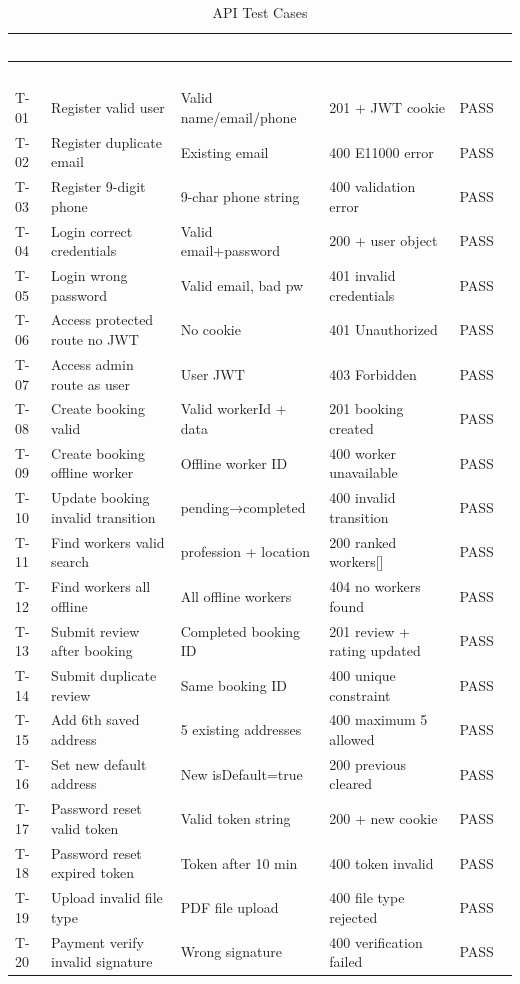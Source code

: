 \documentclass[12pt,a4paper]{report}
\newcommand{\thead}[1]{\cellcolor{tableheader}\textcolor{white}{\textbf{#1}}}
\begin{document}
\begin{longtable}{|p{0.6cm}|p{3cm}|p{4cm}|p{2.5cm}|p{2cm}|}
\caption{API Test Cases}\label{tab:testcases}\\
\hline
\thead{ID} & \thead{Test Case} & \thead{Input} & \thead{Expected} & \thead{Result} \\
\hline
\endfirsthead
\hline
\thead{ID} & \thead{Test Case} & \thead{Input} & \thead{Expected} & \thead{Result} \\
\hline
\endhead
T-01 & Register valid user & Valid name/email/phone & 201 + JWT cookie & PASS \\
\hline
T-02 & Register duplicate email & Existing email & 400 E11000 error & PASS \\
\hline
T-03 & Register 9-digit phone & 9-char phone string & 400 validation error & PASS \\
\hline
T-04 & Login correct credentials & Valid email+password & 200 + user object & PASS \\
\hline
T-05 & Login wrong password & Valid email, bad pw & 401 invalid credentials & PASS \\
\hline
T-06 & Access protected route no JWT & No cookie & 401 Unauthorized & PASS \\
\hline
T-07 & Access admin route as user & User JWT & 403 Forbidden & PASS \\
\hline
T-08 & Create booking valid & Valid workerId + data & 201 booking created & PASS \\
\hline
T-09 & Create booking offline worker & Offline worker ID & 400 worker unavailable & PASS \\
\hline
T-10 & Update booking invalid transition & pending→completed & 400 invalid transition & PASS \\
\hline
T-11 & Find workers valid search & profession + location & 200 ranked workers[] & PASS \\
\hline
T-12 & Find workers all offline & All offline workers & 404 no workers found & PASS \\
\hline
T-13 & Submit review after booking & Completed booking ID & 201 review + rating updated & PASS \\
\hline
T-14 & Submit duplicate review & Same booking ID & 400 unique constraint & PASS \\
\hline
T-15 & Add 6th saved address & 5 existing addresses & 400 maximum 5 allowed & PASS \\
\hline
T-16 & Set new default address & New isDefault=true & 200 previous cleared & PASS \\
\hline
T-17 & Password reset valid token & Valid token string & 200 + new cookie & PASS \\
\hline
T-18 & Password reset expired token & Token after 10 min & 400 token invalid & PASS \\
\hline
T-19 & Upload invalid file type & PDF file upload & 400 file type rejected & PASS \\
\hline
T-20 & Payment verify invalid signature & Wrong signature & 400 verification failed & PASS \\
\hline
\end{longtable}
\end{document}
